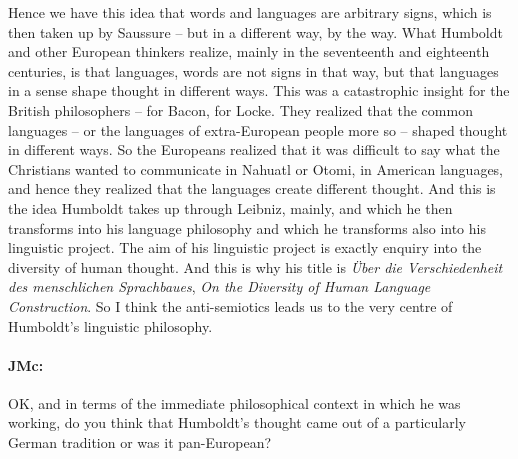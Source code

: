 \documentclass[output=paper]{langscibook}
\begin{document}
Hence we have this idea that words and languages are arbitrary signs, which is then taken up by Saussure – but in a different way, by the way. What Humboldt and other European thinkers realize, mainly in the seventeenth and eighteenth centuries, is that languages, words are not signs in that way, but that languages in a sense shape thought in different ways. This was a catastrophic insight for the British philosophers – for Bacon, for Locke. They realized that the common languages – or the languages of extra-European people more so – shaped thought in different ways. So the Europeans realized that it was difficult to say what the Christians wanted to communicate in Nahuatl or Otomi, in American languages, and hence they realized that the languages create different thought. And this is the idea Humboldt takes up through Leibniz, mainly, and which he then transforms into his language philosophy and which he transforms also into his linguistic project. The aim of his linguistic project is exactly enquiry into the diversity of human thought. And this is why his title is \textit{Über die Verschiedenheit des menschlichen Sprachbaues}, \textit{On the Diversity of Human Language Construction}. So I think the anti-semiotics leads us to the very centre of Humboldt’s linguistic philosophy.


\paragraph*{JMc:} OK, and in terms of the immediate philosophical context in which he was working, do you think that Humboldt’s thought came out of a particularly German tradition or was it pan-European?
\end{document}
